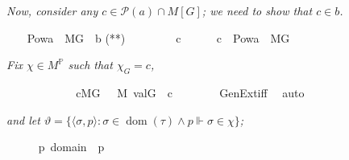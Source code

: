 \textit{Now,
  consider any $c \in \mathcal{P}(a) \cap M[G]$; we need to show that
  $c \in b$.}
\begin{isabelle}
  \label{goal-on-b}
\ \ \isamarkupfalse%
\ {\isachardoublequoteopen}Pow{\isacharparenleft}{\kern0pt}a{\isacharparenright}{\kern0pt}\ {\isasyminter}\ M{\isacharbrackleft}{\kern0pt}G{\isacharbrackright}{\kern0pt}\ {\isasymsubseteq}\ {\isacharquery}{\kern0pt}b{\isachardoublequoteclose}\hfill
\mbox{\rm\small(**)}\isanewline
\ \ \isamarkupfalse%
\isanewline
\ \ \ \ \isamarkupfalse%
\ c\isanewline
\ \ \ \ \isamarkupfalse%
\ {\isachardoublequoteopen}c\ {\isasymin}\ Pow{\isacharparenleft}{\kern0pt}a{\isacharparenright}{\kern0pt}\ {\isasyminter}\ M{\isacharbrackleft}{\kern0pt}G{\isacharbrackright}{\kern0pt}{\isachardoublequoteclose}
\end{isabelle}
\textit{Fix $\chi \in M^{\mathbb{P}}$ such that
  $\chi_{G}=c$,}
\begin{isabelle}
\ \ \ \ \isamarkupfalse%
\isanewline
\ \ \ \ \isamarkupfalse%
\ {\isasymchi}\ \ {\isachardoublequoteopen}c{\isasymin}M{\isacharbrackleft}{\kern0pt}G{\isacharbrackright}{\kern0pt}{\isachardoublequoteclose}\ {\isachardoublequoteopen}{\isasymchi}\ {\isasymin}\ M{\isachardoublequoteclose}\ {\isachardoublequoteopen}val{\isacharparenleft}{\kern0pt}G{\isacharcomma}{\kern0pt}{\isasymchi}{\isacharparenright}{\kern0pt}\ {\isacharequal}{\kern0pt}\ c{\isachardoublequoteclose}\isanewline
\ \ \ \ \ \ \isamarkupfalse%
\ GenExt{\isacharunderscore}{\kern0pt}iff\ \isamarkupfalse%
\ auto
\end{isabelle}
\textit{and let $\vartheta=\{\langle\sigma, p\rangle:
  \sigma \in \operatorname{dom}(\tau) \wedge p \Vdash \sigma \in
  \chi\}$;}
\begin{isabelle}
\ \ \ \ \isamarkupfalse%
\ {\isacharquery}{\kern0pt}{\isasymtheta}{\isacharequal}{\kern0pt}{\isachardoublequoteopen}{\isacharbraceleft}{\kern0pt}{\isasymlangle}{\isasymsigma}{\isacharcomma}{\kern0pt}p{\isasymrangle}\ {\isasymin}domain{\isacharparenleft}{\kern0pt}{\isasymtau}{\isacharparenright}{\kern0pt}{\isasymtimes}\isasymbbbP\ {\isachardot}{\kern0pt}\ p\ {\isasymtturnstile}\ {\isasymcdot}{}\ {\isasymin}\ {}{\isasymcdot}\ {\isacharbrackleft}{\kern0pt}{\isasymsigma}{\isacharcomma}{\kern0pt}{\isasymchi}{\isacharbrackright}{\kern0pt}\ {\isacharbraceright}{\kern0pt}{\isachardoublequoteclose}
\end{isabelle}
